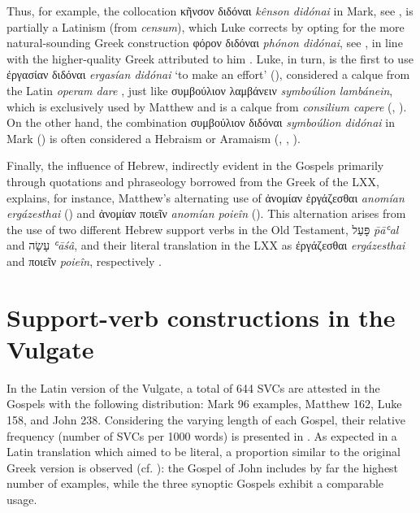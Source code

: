 \documentclass[output=paper,colorlinks,citecolor=brown]{langscibook}
\begin{document}
Thus, for example, the collocation κῆνσον διδόναι \emph{kênson didónai} in Mark, see
, is partially a Latinism (from \emph{censum}), which Luke corrects by
opting for the more natural-sounding Greek construction φόρον διδόναι \emph{phónon
  didónai}, see , in line with the higher-quality Greek attributed to him
\parencites[vol. IV:
47--60]{MHTMoultonTurner1906}{PorterStanleyE-2014141}[98]{JiménezLópezM.Dolores-2018285}.
Luke, in turn, is the first to use ἐργασίαν διδόναι \emph{ergasían didónai} `to make an
effort' (), considered a calque from the Latin \emph{operam dare}
\parencites[II, 1, 123]{Mayser1926}, just like συμβούλιον λαμβάνειν \emph{symboúlion
  lambánein}, which is exclusively used by Matthew and is a calque from \emph{consilium
  capere} (\cite[5--7]{BDFBlassFunk1961}, \cite[7]{Marucci1993}). On the other hand, the
combination συμβούλιον διδόναι \emph{symboúlion didónai} in Mark () is often
considered a Hebraism or Aramaism (\cite[852]{WestcottHort2007},
\cite[128]{ZerwickGrosvenor2008}, \cite{JiménezLópez2017}).



Finally, the influence of Hebrew, indirectly evident in the Gospels primarily through
quotations and phraseology borrowed from the Greek of the LXX, explains, for
instance, Matthew's alternating use of ἀνομίαν ἐργάζεσθαι \emph{anomían ergázesthai}
() and ἀνομίαν ποιεῖν \emph{anomían poieîn} (). This
alternation arises from the use of two different Hebrew support verbs in the Old
Testament,
{פָּעַל}
\emph{p̄āʿal}  and
{עָשָׂה}
\emph{ʿāśâ}, and their literal translation in the LXX as ἐργάζεσθαι
\emph{ergázesthai} and ποιεῖν \emph{poieîn}, respectively
\parencites{BañosJoséMiguelJiménezLópezM.Dolores-2022707,BañosJiménezLópez2024}.


\section{Support-verb constructions in the Vulgate}\label{sec:bj:4}

In the Latin version of the Vulgate, a total of 644 SVCs are attested in the Gospels with
the following distribution: Mark 96 examples, Matthew 162, Luke 158, and John 238.
Considering the varying length of each Gospel, their relative frequency (number of SVCs
per 1000 words) is presented in . As expected in a Latin
translation which aimed to be literal, a proportion similar to the original Greek version
is observed (cf. ): the Gospel of John includes by far the highest
number of examples, while the three synoptic Gospels exhibit a comparable usage.
\end{document}
